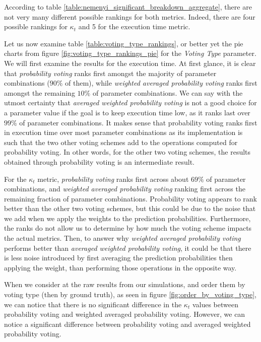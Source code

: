 According to table \ref{table:nemenyi_significant_breakdown_aggregate}, there are not very many different possible rankings for both metrics. Indeed, there are four possible rankings for $\kappa_t$ and 5 for the execution time metric.

Let us now examine table \ref{table:voting_type_rankings}, or better yet the pie charts from figure \ref{fig:voting_type_rankings_pie} for the \textit{Voting Type} parameter.
We will first examine the results for the execution time. At first glance, it is clear that \textit{probability voting} ranks first amongst the majority of parameter combinations ($90\%$ of them), while \textit{weighted averaged probability voting} ranks first amongst the remaining $10\%$ of parameter combinations. We can say with the utmost certainty that \textit{averaged weighted probability voting} is not a good choice for a parameter value if the goal is to keep execution time low, as it ranks last over $99\%$ of parameter combinations. It makes sense that probability voting ranks first in execution time over most parameter combinations as its implementation is such that the two other voting schemes add to the operations computed for probability voting. In other words, for the other two voting schemes, the results obtained through probability voting is an intermediate result.

For the $\kappa_t$ metric, \textit{probability voting} ranks first across about $69\%$ of parameter combinations, and \textit{weighted averaged probability voting} ranking first across the remaining fraction of parameter combinations. Probability voting appears to rank better than the other two voting schemes, but this could be due to the noise that we add when we apply the weights to the prediction probabilities. Furthermore, the ranks do not allow us to determine by how much the voting scheme impacts the actual metrics. Then, to answer why \textit{weighted averaged probability voting} performs better than \textit{averaged weighted probability voting}, it could be that there is less noise introduced by first averaging the prediction probabilities then applying the weight, than performing those operations in the opposite way.

When we consider at the raw results from our simulations, and order them by voting type (then by ground truth), as seen in figure \ref{fig:order_by_voting_type}, we can notice that there is no significant difference in the $\kappa_t$ values between probability voting and weighted averaged probability voting. However, we can notice a significant difference between probability voting and averaged weighted probability voting.

